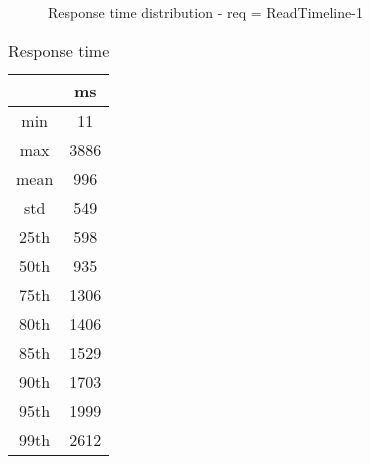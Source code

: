 \begin{minipage}{0.75\linewidth}
\begin{figure}[h]
\begin{adjustbox}{max width=1.0\linewidth, keepaspectratio}
  \end{adjustbox}
  \caption{Response time distribution - req = ReadTimeline-1}
\end{figure}
\end{minipage}\hfill\begin{minipage}{0.18\linewidth}
\begin{table}[h]
\begin{tabular}{|cc|}
\hline
\textbf{} & \textbf{ms}\\ \hline
 \Xhline{0.005\arrayrulewidth}
min & 11\\
 \Xhline{0.005\arrayrulewidth}
max & 3886\\
 \Xhline{0.005\arrayrulewidth}
mean & 996\\
 \Xhline{0.005\arrayrulewidth}
std & 549\\
\hline
\hline
 \Xhline{0.005\arrayrulewidth}
25th & 598\\
 \Xhline{0.005\arrayrulewidth}
50th & 935\\
 \Xhline{0.005\arrayrulewidth}
75th & 1306\\
 \Xhline{0.005\arrayrulewidth}
80th & 1406\\
 \Xhline{0.005\arrayrulewidth}
85th & 1529\\
 \Xhline{0.005\arrayrulewidth}
90th & 1703\\
 \Xhline{0.005\arrayrulewidth}
95th & 1999\\
 \Xhline{0.005\arrayrulewidth}
99th & 2612\\
\hline
\end{tabular}
\caption{Response time}
\end{table}
\end{minipage}\hfill